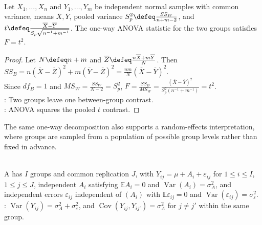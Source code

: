 \begin{corollary} \label{cor:two-treatment-one-way-anova-equals-pooled-t} \\
Let $X_1,\ldots,X_n$ and $Y_1,\ldots,Y_m$ be independent normal samples with common variance, means $\overline{X},\overline{Y}$, pooled variance $S_p^2\defeq \frac{SS_W}{n+m-2}$, and $t\defeq\frac{\overline{X}-\overline{Y}}{S_p\sqrt{n^{-1}+m^{-1}}}$. The one-way ANOVA statistic for the two groups satisfies $F=t^2$.
\begin{proof} Let $N\defeq n+m$ and $\overline{Z}\defeq\frac{n\overline{X}+m\overline{Y}}{N}$. Then $SS_B=n(\overline{X}-\overline{Z})^2+m(\overline{Y}-\overline{Z})^2=\frac{nm}{N}(\overline{X}-\overline{Y})^2$.\\
Since $df_B=1$ and $MS_W=\frac{SS_W}{N-2}=S_p^2$, $F=\frac{SS_B}{MS_W}=\frac{(\overline{X}-\overline{Y})^2}{S_p^2(n^{-1}+m^{-1})}=t^2$.\\
: Two groups leave one between-group contrast.\\
: ANOVA squares the pooled $t$ contrast.
\end{proof}
\end{corollary}

The same one-way decomposition also supports a random-effects interpretation, where groups are sampled from a population of possible group levels rather than fixed in advance.

\begin{definition} \label{def:one-way-random-effects-model} \\
A  has $I$ groups and common replication $J$, with $Y_{ij}=\mu+A_i+\varepsilon_{ij}$ for $1\leq i\leq I$, $1\leq j\leq J$, independent $A_i$ satisfying $\mathbb{E}A_i=0$ and $\operatorname{Var}(A_i)=\sigma_A^2$, and independent errors $\varepsilon_{ij}$ independent of $(A_i)$ with $\mathbb{E}\varepsilon_{ij}=0$ and $\operatorname{Var}(\varepsilon_{ij})=\sigma_\varepsilon^2$.\\
: $\operatorname{Var}(Y_{ij})=\sigma_A^2+\sigma_\varepsilon^2$, and $\operatorname{Cov}(Y_{ij},Y_{ij'})=\sigma_A^2$ for $j\ne j'$ within the same group.
\end{definition}

